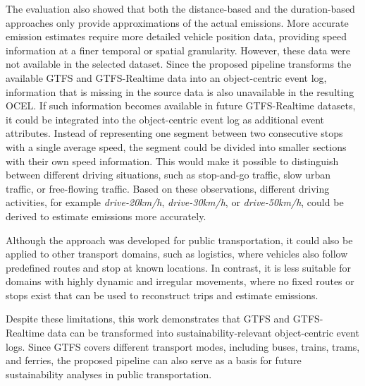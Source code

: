 The evaluation also showed that both the distance-based and the duration-based approaches only provide approximations of the actual emissions. More accurate emission estimates require more detailed vehicle position data, providing speed information at a finer temporal or spatial granularity. However, these data were not available in the selected dataset. Since the proposed pipeline transforms the available GTFS and GTFS-Realtime data into an object-centric event log, information that is missing in the source data is also unavailable in the resulting OCEL. If such information becomes available in future GTFS-Realtime datasets, it could be integrated into the object-centric event log as additional event attributes. Instead of representing one segment between two consecutive stops with a single average speed, the segment could be divided into smaller sections with their own speed information. This would make it possible to distinguish between different driving situations, such as stop-and-go traffic, slow urban traffic, or free-flowing traffic. Based on these observations, different driving activities, for example \textit{drive-20km/h}, \textit{drive-30km/h}, or \textit{drive-50km/h}, could be derived to estimate emissions more accurately.

Although the approach was developed for public transportation, it could also be applied to other transport domains, such as logistics, where vehicles also follow predefined routes and stop at known locations. In contrast, it is less suitable for domains with highly dynamic and irregular movements, where no fixed routes or stops exist that can be used to reconstruct trips and estimate emissions.

Despite these limitations, this work demonstrates that GTFS and GTFS-Realtime data can be transformed into sustainability-relevant object-centric event logs. Since GTFS covers different transport modes, including buses, trains, trams, and ferries, the proposed pipeline can also serve as a basis for future sustainability analyses in public transportation.
